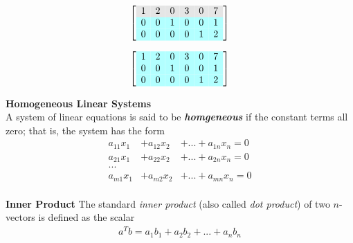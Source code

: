 \documentclass[a4paper, 12pt]{article}
\begin{document}
\begin{enumerate}
\[ \left[ {\begin{array}{cccccc} 
\rowcolor{Gray}
1 & 2 & 0 & 3 & 0 & 7 \\ 
\rowcolor{LightCyan}
0 & 0 & 1  & 0 & 0 & 1\\
\rowcolor{LightCyan}
0 & 0 & 0  & 0 & 1  & 2 
\end{array}} \right] \]

\[ \left[ {\begin{array}{cccccc} 
\rowcolor{LightCyan}
1 & 2 & 0 & 3 & 0 & 7 \\ 
\rowcolor{LightCyan}
0 & 0 & 1  & 0 & 0 & 1\\
\rowcolor{LightCyan}
0 & 0 & 0  & 0 & 1  & 2 
\end{array}} \right] \]

\end{enumerate}

\textbf{Homogeneous Linear Systems} \\
A system of linear equations is said to be \textbf{\textit{homgeneous}} if 
the constant terms all zero; that is, the system has the form
\begin{eqnarray*}
a_{11}x_1  &+ a_{12}x_2 &+ ... + a_{1n}x_n = 0\\
a_{21}x_1  &+ a_{22}x_2 &+ ... + a_{2n}x_n = 0\\
...\\
a_{m1}x_1  &+ a_{m2}x_2 &+ ... + a_{mn}x_n = 0\\
\end{eqnarray*}

\textbf{Inner Product}
The standard \textit{inner product} (also called \textit{dot product}) of 
two $n$-vectors is defined as the scalar
\begin{align*}
a^Tb = a_1b_1 + a_2b_2 + ... + a_nb_n
\end{align*}
\end{document}
